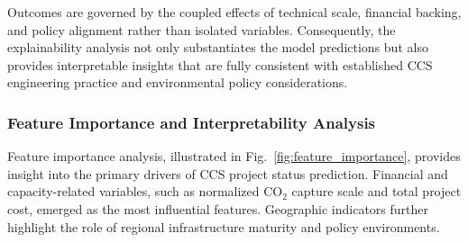 \documentclass[conference]{IEEEtran}
\begin{document}

Outcomes are governed by the coupled effects of technical scale, financial backing, and policy alignment rather than isolated variables. Consequently, the explainability analysis not only substantiates the model predictions but also provides interpretable insights that are fully consistent with established CCS engineering practice and environmental policy considerations.



\subsubsection{Feature Importance and Interpretability Analysis}

Feature importance analysis, illustrated in Fig.~\ref{fig:feature_importance}, provides insight into the primary drivers of CCS project status prediction. Financial and capacity-related variables, such as normalized CO$_2$ capture scale and total project cost, emerged as the most influential features. Geographic indicators further highlight the role of regional infrastructure maturity and policy environments.
\end{document}
